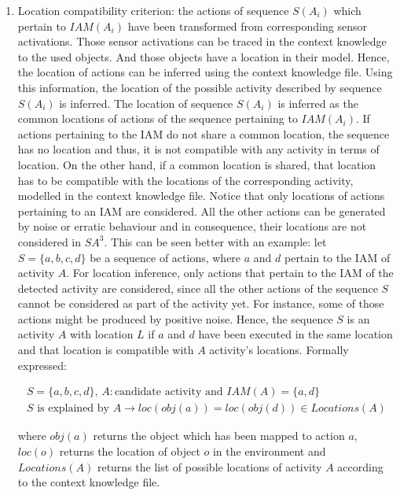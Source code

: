 \begin{enumerate}
  \item Location compatibility criterion: the actions of sequence $S(A_i)$ which pertain to $IAM(A_i)$ have been transformed from corresponding sensor activations. Those sensor activations can be traced in the context knowledge to the used objects. And those objects have a location in their model. Hence, the location of actions can be inferred using the context knowledge file. Using this information, the location of the possible activity described by sequence $S(A_i)$ is inferred. The location of sequence $S(A_i)$ is inferred as the common locations of actions of the sequence pertaining to $IAM(A_i)$. If actions pertaining to the IAM do not share a common location, the sequence has no location and thus, it is not compatible with any activity in terms of location. On the other hand, if a common location is shared, that location has to be compatible with the locations of the corresponding activity, modelled in the context knowledge file. Notice that only locations of actions pertaining to an IAM are considered. All the other actions can be generated by noise or erratic behaviour and in consequence, their locations are not considered in $SA^3$. This can be seen better with an example: let $S=\{a, b, c, d\}$ be a sequence of actions, where $a$ and $d$ pertain to the IAM of activity $A$. For location inference, only actions that pertain to the IAM of the detected activity are considered, since all the other actions of the sequence $S$ cannot be considered as part of the activity yet. For instance, some of those actions might be produced by positive noise. Hence, the sequence $S$ is an activity $A$ with location $L$ if $a$ and $d$ have been executed in the same location and that location is compatible with $A$ activity's locations. Formally expressed:

\begin{equation}
 \begin{split}
  S = \{a, b, c, d \}\text{, }  A: \text{candidate activity } \text{and } IAM(A) = \{a, d \}\\
  S \text{ is explained by } A \rightarrow loc(obj(a)) = loc(obj(d)) \in Locations(A)
 \end{split}
\end{equation}

\noindent where $obj(a)$ returns the object which has been mapped to action $a$, $loc(o)$ returns the location of object $o$ in the environment and $Locations(A)$ returns the list of possible locations of activity $A$ according to the context knowledge file.
 \end{enumerate}

